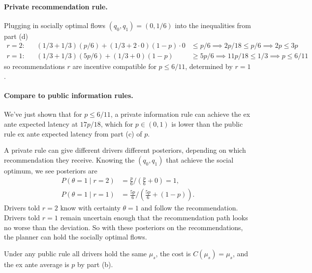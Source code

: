 \documentclass[11pt]{exam}
\begin{document}
\begin{questions}
\begin{parts}
        \paragraph{Private recommendation rule.}
        Plugging in socially optimal flows $(q_0,q_1) = (0,1/6)$ into the inequalities from part (d)
        \begin{align*}
            r=2:&& (1/3 + 1/3)(p/6) + (1/3 + 2\cdot 0)(1-p)\cdot 0 &\leq p/6 
            \implies 2p/18 \leq p/6 
            \implies 2p \leq 3p \tag{$r=2$ is incentive compatible $\forall\;p\in(0,1)$}\\[1em]
            r=1:&& (1/3 + 1/3)(5p/6) + (1/3 + 0)(1-p) &\geq 5p/6 
            \implies 11p/18 \leq 1/3 \implies p \leq 6/11
        \end{align*}
        so recommendations $r$ are incentive compatible for $p\leq 6/11$, determined by $r=1$. 
        
        \paragraph{Compare to public information rules.}
        We've just shown that for $p \leq 6/11$, a private information rule can achieve the ex ante expected latency at $17p/18$, which for $p\in(0,1)$ is lower than the public rule ex ante expected latency from part (c) of $p$.  

        A private rule can give different drivers different posteriors, depending on which recommendation they receive. Knowing the $(q_0,q_1)$ that achieve the social optimum, we see posteriors are 
        \begin{align*}
            P(\theta=1\mid r=2) &= \tfrac{p}{6} / (\tfrac{p}{6} + 0) = 1,\\
            P(\theta=1\mid r=1) &= \tfrac{5p}{6} / (\tfrac{5p}{6} + (1-p)).
        \end{align*}
        Drivers told $r=2$ know with certainty $\theta=1$ and follow the recommendation. Drivers told $r=1$ remain uncertain enough that the recommendation path looks no worse than the deviation. So with these posteriors on the recommendations, the planner can hold the socially optimal flows. 

        Under any public rule all drivers hold the same $\mu_s$, the cost is $C(\mu_s) = \mu_s$, and the ex ante average is $p$ by part (b).



\end{parts}
\end{questions}
\end{document}
